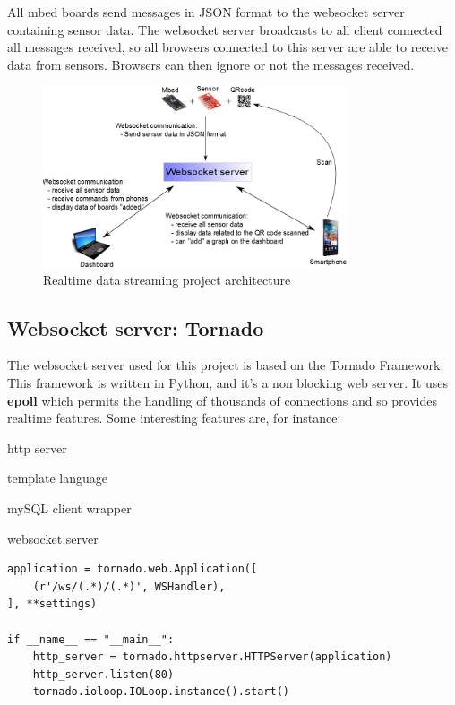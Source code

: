 \documentclass[pdftex,10pt,a4paper]{report}
\newenvironment{packed_item}{
\begin{itemize}
  \setlength{\itemsep}{1pt}
  \setlength{\parskip}{0pt}
  \setlength{\parsep}{0pt}
}{\end{itemize}}
\begin{document}
All mbed boards send messages in JSON format to the websocket server containing sensor data. The websocket server broadcasts to all client connected all messages received, so all browsers connected to this server are able to receive data from sensors. Browsers can then ignore or not the messages received.
 
\begin{figure}[h!]
		\centering
		\includegraphics[width=0.8\textwidth]{./ws_arch.png}
		\caption{Realtime data streaming project architecture}
		\label{Realtime data streaming project architecture}
\end{figure}


\subsection{Websocket server: Tornado}
The websocket server used for this project is based on the Tornado Framework. This framework is written in Python, and it's a non blocking web server. It uses \textbf{epoll} which permits the handling of thousands of connections and so provides realtime features. Some interesting features are, for instance:
\begin{packed_item}
	\item http server
	\item template language
	\item mySQL client wrapper
	\item websocket server
\end{packed_item}

\begin{lstlisting}[label=Launching of an HTTP server with Tornado,caption=Launching of an HTTP server with Tornado]
application = tornado.web.Application([
    (r'/ws/(.*)/(.*)', WSHandler),
], **settings)

if __name__ == "__main__":
    http_server = tornado.httpserver.HTTPServer(application)
    http_server.listen(80)
    tornado.ioloop.IOLoop.instance().start()
\end{lstlisting}
\end{document}
